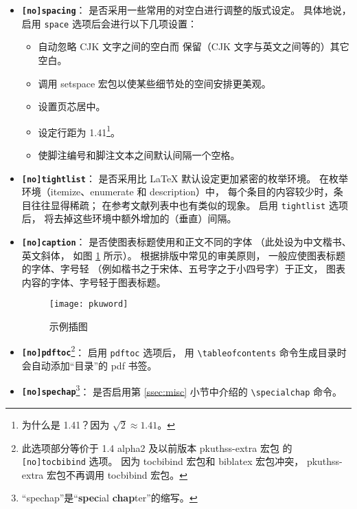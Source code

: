 		\begin{itemize}
			\item \textbf{\texttt{[no]spacing}}：
				是否采用一些常用的对空白进行调整的版式设定。
				具体地说，启用 \verb|space| 选项后会进行以下几项设置：
			\begin{itemize}
				\item 自动忽略 CJK 文字之间的空白而%
					保留（CJK 文字与英文之间等的）其它空白。
				\item 调用 setspace 宏包以使某些细节处的空间安排更美观。
				\item 设置页芯居中。
				\item 设定行距为 1.41\footnote{%
					为什么是 1.41？因为 $\sqrt{2}\approx1.41$。%
				}。
				\item 使脚注编号和脚注文本之间默认间隔一个空格。
			\end{itemize}

			\item \textbf{\texttt{[no]tightlist}}：
				是否采用比 \LaTeX{} 默认设定更加紧密的枚举环境。
				在枚举环境（itemize、enumerate 和 description）中，
				每个条目的内容较少时，条目往往显得稀疏；
				在参考文献列表中也有类似的现象。
				启用 \verb|tightlist| 选项后，
				将去掉这些环境中额外增加的（垂直）间隔。

			\item \textbf{\texttt{[no]caption}}：
				是否使图表标题使用和正文不同的字体
				（此处设为中文楷书、英文斜体，
				如图 \ref{fig:example} 所示）。
				根据排版中常见的审美原则，
				一般应使图表标题的字体、字号轻
				（例如楷书之于宋体、五号字之于小四号字）于正文，
				图表内容的字体、字号轻于图表标题。

			\begin{figure}[htbp!]
				\centering
				\texttt{[image: pkuword]}
				\caption{示例插图}\label{fig:example}
			\end{figure}

			\item \textbf{\texttt{[no]pdftoc}}\footnote{%
					此选项部分等价于 1.4 alpha2 及以前版本 pkuthss-extra 宏包%
					的 \texttt{[no]tocbibind} 选项。
					因为 tocbibind 宏包和 biblatex 宏包冲突，
					pkuthss-extra 宏包不再调用 tocbibind 宏包。%
				}：
				启用 \verb|pdftoc| 选项后，
				用 \verb|\tableofcontents| 命令生成目录时%
				会自动添加“目录”的 pdf 书签。

			\item \textbf{\texttt{[no]spechap}}\footnote{%
					“spechap”是“\textbf{spec}ial \textbf{chap}ter”的缩写。%
				}：
				是否启用第 \ref{ssec:misc} 小节中介绍的 %
				\verb|\specialchap| 命令。


\end{itemize}
